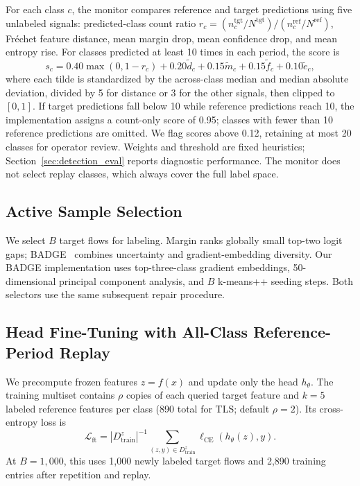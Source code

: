 \documentclass[journal]{IEEEtran}
\begin{document}
For each class $c$, the monitor compares reference and target predictions using five unlabeled signals: predicted-class count ratio $r_c=(n_c^{\mathrm{tgt}}/N^{\mathrm{tgt}})/(n_c^{\mathrm{ref}}/N^{\mathrm{ref}})$, Fr\'{e}chet feature distance, mean margin drop, mean confidence drop, and mean entropy rise. For classes predicted at least 10 times in each period, the score is
\begin{equation}
 s_c=0.40\max(0,1-r_c)+0.20\tilde d_c+0.15\tilde m_c+0.15\tilde f_c+0.10\tilde e_c,
\end{equation}
where each tilde is standardized by the across-class median and median absolute deviation, divided by 5 for distance or 3 for the other signals, then clipped to $[0,1]$. If target predictions fall below 10 while reference predictions reach 10, the implementation assigns a count-only score of 0.95; classes with fewer than 10 reference predictions are omitted. We flag scores above 0.12, retaining at most 20 classes for operator review. Weights and threshold are fixed heuristics; Section~\ref{sec:detection_eval} reports diagnostic performance. The monitor does not select replay classes, which always cover the full label space.

\subsection{Active Sample Selection}
\label{sec:sample_select}


We select $B$ target flows for labeling. Margin ranks globally small top-two logit gaps; BADGE~\cite{ash2020badge} combines uncertainty and gradient-embedding diversity. Our BADGE implementation uses top-three-class gradient embeddings, 50-dimensional principal component analysis, and $B$ k-means++ seeding steps. Both selectors use the same subsequent repair procedure.

\subsection{Head Fine-Tuning with All-Class Reference-Period Replay}
\label{sec:ft_replay}


We precompute frozen features $z=f(x)$ and update only the head $h_\theta$. The training multiset contains $\rho$ copies of each queried target feature and $k=5$ labeled reference features per class (890 total for TLS; default $\rho=2$). Its cross-entropy loss is
\begin{equation}
 \mathcal L_{\mathrm{ft}}=|D_{\mathrm{train}}^z|^{-1}\sum_{(z,y)\in D_{\mathrm{train}}^z}\ell_{\mathrm{CE}}(h_\theta(z),y).
\end{equation}
At $B=1{,}000$, this uses 1{,}000 newly labeled target flows and 2{,}890 training entries after repetition and replay.
\end{document}
